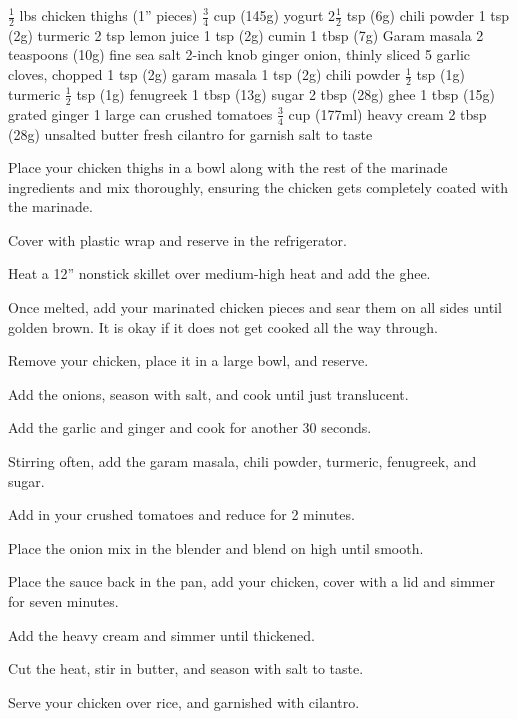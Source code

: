 \dishtype{}
\begin{ingreds}
    $\frac{1}{2}$ lbs chicken thighs (1'' pieces)
        $\frac{3}{4}$ cup (145g) yogurt
        2$\frac{1}{2}$ tsp (6g) chili powder
        1 tsp (2g) turmeric
        2 tsp lemon juice
        1 tsp (2g) cumin
        1 tbsp (7g) Garam masala
        2 teaspoons (10g) fine sea salt
        2-inch knob ginger
    \columnbreak{}
     onion, thinly sliced
        5 garlic cloves, chopped
        1 tsp (2g) garam masala
        1 tsp (2g) chili powder
        $\frac{1}{2}$ tsp (1g) turmeric
        $\frac{1}{2}$ tsp (1g) fenugreek
        1 tbsp (13g) sugar
        2 tbsp (28g) ghee
        1 tbsp (15g) grated ginger
        1 large can crushed tomatoes
        $\frac{3}{4}$ cup (177ml) heavy cream
        2 tbsp (28g) unsalted butter
        fresh cilantro for garnish
        salt to taste
\end{ingreds}
\begin{method}
    Place your chicken thighs in a bowl along with the rest of the marinade ingredients and mix thoroughly, ensuring the chicken gets completely coated with the marinade.\par
    Cover with plastic wrap and reserve in the refrigerator.\par
    Heat a 12'' nonstick skillet over medium-high heat and add the ghee.\par
    Once melted, add your marinated chicken pieces and sear them on all sides until golden brown. It is okay if it does not get cooked all the way through.\par
    Remove your chicken, place it in a large bowl, and reserve.\par
    Add the onions, season with salt, and cook until just translucent.\par
    Add the garlic and ginger and cook for another 30 seconds.\par
    Stirring often, add the garam masala, chili powder, turmeric, fenugreek, and sugar.\par
    Add in your crushed tomatoes and reduce for 2 minutes.\par
    Place the onion mix in the blender and blend on high until smooth.\par
    Place the sauce back in the pan, add your chicken, cover with a lid and simmer for seven minutes.\par
    Add the heavy cream and simmer until thickened.\par
    Cut the heat, stir in butter, and season with salt to taste.\par
    Serve your chicken over rice, and garnished with cilantro.    
\end{method}